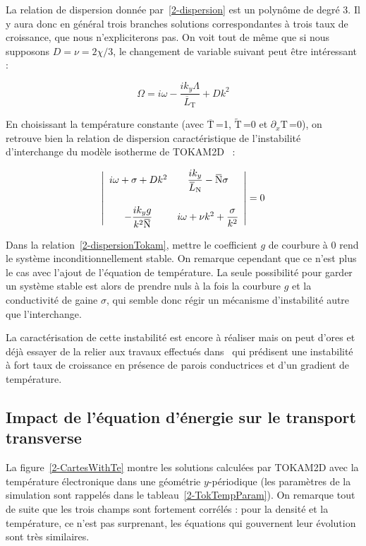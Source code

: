 \begin{refsection}
 La relation de dispersion donnée
 par~\eqref{2-dispersion} est un polynôme de degré 3. Il y aura donc en général
 trois branches solutions correspondantes à trois taux de croissance, que nous
 n'expliciterons pas. On voit tout de même que si nous supposons
 $D=\nu=2\chi/3$, le changement de variable suivant peut être intéressant :
 
  \begin{equation}
 \Omega=i\omega
-\dfrac{ik_y\Lambda}{\overbar{L}_{\text{T}}}+Dk^2
 \end{equation}
 
 En choisissant la température
 constante (avec $\overbar{\text{T}}\,$=1, $\widetilde{\text{T}}\,$=0 et $\partial_x\text{T}\,$=0), on retrouve bien la relation de dispersion caractéristique de l'instabilité
 d'interchange du modèle isotherme de TOKAM2D~\parencite{SarazinPhD} :
 
\begin{equation}
\label{2-dispersionTokam}
\left|\begin{array}{ccc}
i\omega+\sigma+Dk^2
&
\dfrac{ik_y}{\overbar{L}_\text{N}}-\overbar{\text{N}}\sigma
\\[2em]
-\dfrac{ik_yg}{k^2\overbar{\text{N}}} 
& 
i\omega+\nu k^2+\dfrac{\sigma}{k^2}
\end{array}\right|=0\\[3ex]
\end{equation}

Dans la relation~\eqref{2-dispersionTokam}, mettre le coefficient $g$ de
courbure à 0 rend le système inconditionnellement stable. On remarque cependant
que ce n'est plus le cas avec l'ajout de l'équation de température. La seule
possibilité pour garder un système stable est alors de prendre nuls à la fois
la courbure $g$ et la conductivité de gaine $\sigma$, qui semble donc régir un
mécanisme d'instabilité autre que l'interchange.

La caractérisation de cette
instabilité est encore à réaliser mais on peut d'ores et déjà essayer de la
relier aux travaux effectués dans~\parencite{Berk} qui prédisent une instabilité
à fort taux de croissance en présence de parois conductrices et d'un gradient
de température.

\subsection{Impact de l'équation d'énergie sur le transport transverse}

La figure~\ref{2-CartesWithTe} montre les solutions calculées par TOKAM2D avec
la température électronique dans une géométrie $y$-périodique (les paramètres
de la simulation sont rappelés dans le tableau~\ref{2-TokTempParam}).
On remarque tout de suite que les trois champs sont fortement corrélés : pour la densité et
la température, ce n'est pas surprenant, les équations qui gouvernent leur
évolution sont très similaires. 


\end{refsection}
